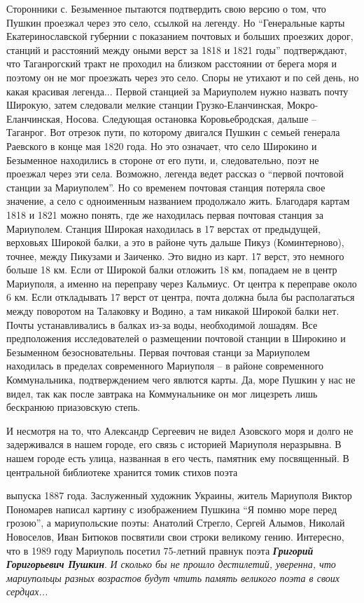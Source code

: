 Сторонники с. Безыменное пытаются подтвердить свою версию о том, что Пушкин
проезжал через это село, ссылкой на легенду. Но \enquote{Генеральные карты
Екатеринославской губернии с показанием почтовых и больших проезжих дорог,
станций и расстояний между оными верст за 1818 и 1821 годы} подтверждают, что
Таганрогский тракт не проходил на близком расстоянии от берега моря и поэтому
он не мог проезжать через это село. Споры не утихают и по сей день, но какая
красивая легенда... Первой станцией за Мариуполем нужно назвать почту Широкую,
затем следовали мелкие станции Грузко-Еланчинская, Мокро-Еланчинская, Носова.
Следующая остановка Коровьебродская, дальше – Таганрог. Вот отрезок пути, по
которому двигался Пушкин с семьей генерала Раевского в конце мая 1820 года. Но
это означает, что село Широкино и Безыменное находились в стороне от его пути,
и, следовательно, поэт не проезжал через эти села. Возможно, легенда ведет
рассказ о \enquote{первой почтовой станции за Мариуполем}. Но со временем почтовая
станция потеряла свое значение, а село с одноименным названием продолжало жить.
Благодаря картам 1818 и 1821 можно понять, где же находилась первая почтовая
станция за Мариуполем.  Станция Широкая находилась  в 17 верстах от предыдущей,
верховьях Широкой балки, а это в районе чуть дальше Пикуз (Коминтерново),
точнее, между Пикузами и Заиченко. Это видно из карт. 17 верст, это немного
больше  18 км. Если от Широкой балки отложить 18 км, попадаем не в центр
Мариуполя, а именно на переправу через Кальмиус. От центра к переправе около 6
км. Если откладывать 17 верст от центра, почта должна была бы располагаться
между поворотом на Талаковку и Водино, а там никакой Широкой балки нет. Почты
устанавливались в балках из-за воды, необходимой лошадям. Все предположения
исследователей о размещении почтовой станции в Широкино и Безыменном
безосновательны. Первая почтовая станци за Мариуполем находилась в пределах
современного Мариуполя – в районе современного Коммунальника, подтверждением
чего явлются карты. Да, море Пушкин у нас не видел, так как после завтрака на
Коммунальнике он мог лицезреть лишь бескранюю приазовскую степь.

И несмотря на то, что Александр Сергеевич не видел Азовского моря и долго не
задерживался в нашем городе, его связь с историей Мариуполя неразрывна. В нашем
городе есть улица, названная в его честь, памятник ему посвященный. В
центральной библиотеке хранится томик стихов поэта


выпуска 1887 года. Заслуженный художник Украины, житель Мариуполя Виктор
Пономарев написал картину с изображением Пушкина \enquote{Я помню море перед грозою}, а
мариупольские поэты: Анатолий Стрегло, Сергей Алымов, Николай Новоселов, Иван
Битюков посвятили свои строки великому гению. Интересно, что в 1989 году
Мариуполь посетил 75-летний правнук поэта \textbf{\emph{Григорий Горигорьевич
Пушкин}}. \emph{И сколько бы не прошло дестилетий, уверенна, что мариупольцы
разных возрастов будут чтить память великого поэта в своих сердцах...}
